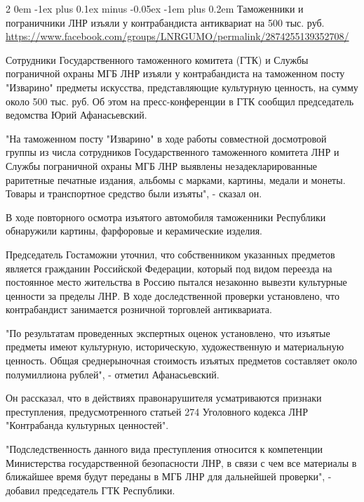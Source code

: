 \documentclass[a4paper,11pt]{extreport}
\makeatletter
\renewcommand\subsection{%
  \clearpage
    \@startsection{subsection}%
    {2}%
    {0em}%
    {-1ex plus 0.1ex minus -0.05ex}%
    {-1em plus 0.2em}%
    {\scshape\bfseries\Large}%
}
\makeatother
\begin{document}
 
 
\subsection{Таможенники и пограничники ЛНР изъяли у контрабандиста антиквариат на 500 тыс. руб.}
\label{sec:24_07_2020.fb.lnr.1}
\url{https://www.facebook.com/groups/LNRGUMO/permalink/2874255139352708/}

Сотрудники Государственного таможенного комитета (ГТК) и Службы пограничной
охраны МГБ ЛНР изъяли у контрабандиста на таможенном посту "Изварино" предметы
искусства, представляющие культурную ценность, на сумму около 500 тыс. руб. Об
этом на пресс-конференции в ГТК сообщил председатель ведомства Юрий
Афанасьевский.

"На таможенном посту "Изварино" в ходе работы совместной досмотровой группы из
числа сотрудников Государственного таможенного комитета ЛНР и Службы
пограничной охраны МГБ ЛНР выявлены незадекларированные раритетные печатные
издания, альбомы с марками, картины, медали и монеты. Товары и транспортное
средство были изъяты", - сказал он.

В ходе повторного осмотра изъятого автомобиля таможенники Республики обнаружили
картины, фарфоровые и керамические изделия.

Председатель Гостаможни уточнил, что собственником указанных предметов является
гражданин Российской Федерации, который под видом переезда на постоянное место
жительства в Россию пытался незаконно вывезти культурные ценности за пределы
ЛНР. В ходе доследственной проверки установлено, что контрабандист занимается
розничной торговлей антиквариата.

"По результатам проведенных экспертных оценок установлено, что изъятые предметы
имеют культурную, историческую, художественную и материальную ценность. Общая
среднерыночная стоимость изъятых предметов составляет около полумиллиона
рублей", - отметил Афанасьевский.

Он рассказал, что в действиях правонарушителя усматриваются признаки
преступления, предусмотренного статьей 274 Уголовного кодекса ЛНР "Контрабанда
культурных ценностей".

"Подследственность данного вида преступления относится к компетенции
Министерства государственной безопасности ЛНР, в связи с чем все материалы в
ближайшее время будут переданы в МГБ ЛНР для дальнейшей проверки", - добавил
председатель ГТК Республики.
\end{document}
